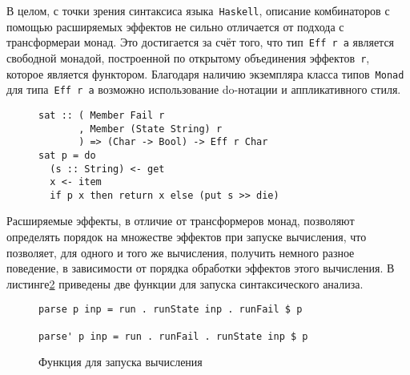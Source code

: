   В целом, с точки зрения синтаксиса языка~\lstinline{Haskell}, описание 
  комбинаторов с помощью расширяемых эффектов не сильно отличается от 
  подхода с трансформераи монад. Это достигается за счёт того, что 
  тип~\lstinline{Eff r a} является свободной монадой, построенной по открытому 
  объединения эффектов~\lstinline{r}, которое является функтором. Благодаря
  наличию экземпляра класса типов~\lstinline{Monad} для типа~\lstinline{Eff r a}
  возможно использование do-нотации и аппликативного стиля.

  \begin{figure}[h]
  \begin{lstlisting}
sat :: ( Member Fail r
       , Member (State String) r
       ) => (Char -> Bool) -> Eff r Char
sat p = do
  (s :: String) <- get
  x <- item
  if p x then return x else (put s >> die)
  \end{lstlisting}
  \label{listing:extEffSat}
  \end{figure} 

  Расширяемые эффекты, в отличие от трансформеров монад, позволяют определять 
  порядок на множестве эффектов при запуске вычисления, что позволяет, для 
  одного и того же вычисления, получить немного разное поведение, в зависимости от
  порядка обработки эффектов этого вычисления. В листинге\ref{listing:extEffparse}
  приведены две функции для запуска синтаксического анализа. 

  \begin{figure}[h]
  \begin{lstlisting}
parse p inp = run . runState inp . runFail $ p

parse' p inp = run . runFail . runState inp $ p 
  \end{lstlisting}
  \caption{Функция для запуска вычисления}
  \label{listing:extEffparse}
  \end{figure}


